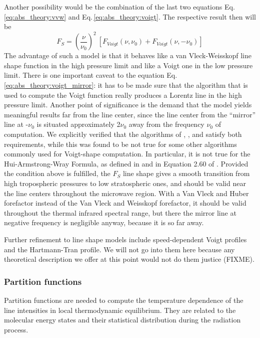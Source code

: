 Another possibility would be the combination of the last two equations
Eq.\,\ref{eq:abs_theory:vvw} and Eq.\,\ref{eq:abs_theory:voigt}. The respective result then will be 
\begin{equation}\label{eq:abs_theory:voigt_mirror}
 F_S=\left(\frac{\nu}{\nu_0}\right)^2~[F_{Voigt}(\nu,\nu_0)+F_{Voigt}(\nu,-\nu_0)]
\end{equation}
The advantage of such a model is that it behaves like a van
Vleck-Weisskopf line shape function in the high pressure limit and
like a Voigt one in the low pressure limit. There is one important
caveat to the equation Eq.\,\ref{eq:abs_theory:voigt_mirror}: it has to be made sure
that the algorithm that is used to compute the Voigt function really
produces a Lorentz line in the high pressure limit. Another point of
significance is the demand that the model yields meaningful results
far from the line center, since the line center from the ``mirror''
line at -$\nu_0$ is situated approximately 2$\nu_0$ away from the
frequency $\nu_0$ of computation. We explicitly verified that the
algorithms of \citet{Drayson:76}, \citet{Oliveiro:77}, and
\citet{kuntz:99} satisfy both requirements, while this was found to be
not true for some other algorithms commonly used for Voigt-shape
computation. In particular, it is not true for the Hui-Armstrong-Wray
Formula, as defined in \citet{hui:78} and in Equation 2.60 of
\citet{pwr:93}. Provided the condition above is fulfilled, the $F_S$
line shape gives a smooth transition from high tropospheric pressures
to low stratospheric ones, and should be valid near the line centers
throughout the microwave region. With a Van Vleck and Huber forefactor
instead of the Van Vleck and Weisskopf forefactor, it should be valid
throughout the thermal infrared spectral range, but there the mirror
line at negative frequency is negligible anyway, because it is so far
away.

Further refinement to line shape models include speed-dependent Voigt profiles
and the Hartmann-Tran profile.  We will not go into them here because
any theoretical description we offer at this point would not do them justice (FIXME).

\subsubsection{Partition functions}

Partition functions are needed to compute the temperature dependence
of the line intensities in local thermodynamic equilibrium.
They are related to the molecular energy states and their statistical
distribution during the radiation process.

